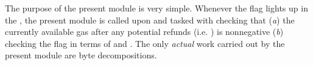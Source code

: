 The purpose of the present \gasMod{} module is very simple.
Whenever the \cmc{} flag lights up in the \hubMod{}, the present module is called upon and tasked with checking that
(\emph{a})
the currently available gas after any potential refunds (i.e. \gasActual{}) is nonnegative
(\emph{b})
checking the \stackOogx{} flag in terms of \gasActual{} and \gasCost{}. The only \emph{actual} work carried out by the present module are byte decompositions.
